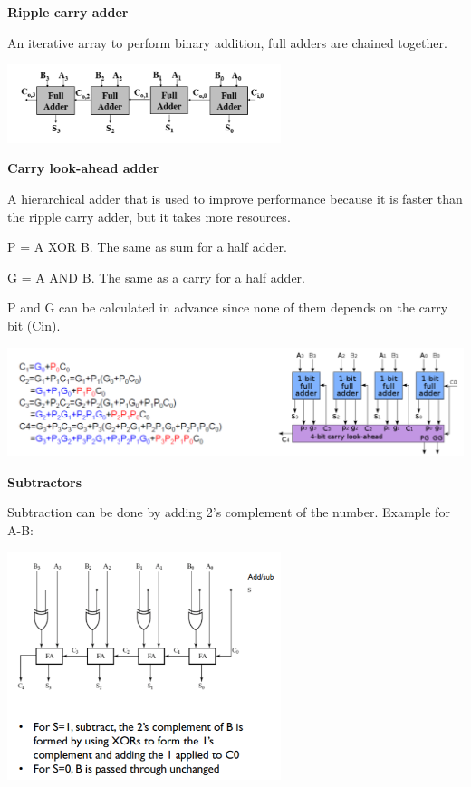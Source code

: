 \textbf{Ripple carry adder}

An iterative array to perform binary addition, full adders are chained
together.

\begin{center}
	\includegraphics[width=0.6\textwidth]{images/rippleCarry.png}
\end{center}

\textbf{Carry look-ahead adder}

A hierarchical adder that is used to improve performance
because it is faster than the ripple carry adder, but it takes
more resources.

P = A XOR B. The same as sum for a half adder.

G = A AND B. The same as a carry for a half adder.

P and G can be calculated in advance since none of them
depends on the carry bit (Cin).

\begin{center}
	\includegraphics[width=\textwidth]{images/lookAhead.png}
\end{center}


\textbf{Subtractors}

Subtraction can be done by adding 2's complement of the number.
Example for A-B:

\begin{center}
	\includegraphics[width=0.6\textwidth]{images/subtract.png}
\end{center}


